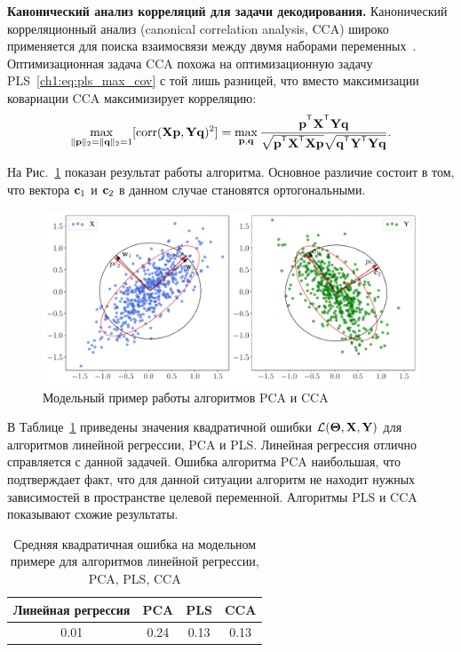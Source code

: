 \vspace{0.5cm}
\textbf{Канонический анализ корреляций для задачи декодирования.}
Канонический корреляционный анализ (canonical correlation analysis, CCA) широко применяется для поиска взаимосвязи между двумя наборами переменных~\cite{hotelling1992relations,anderson1962introduction}. 
Оптимизационная задача CCA похожа на оптимизационную задачу PLS~\eqref{ch1:eq:pls_max_cov} с той лишь разницей, что вместо максимизации ковариации CCA максимизирует корреляцию:
\begin{equation}
	\max_{\|\bp\|_{2}=\|\bq\|_{2}=1}[ \text{corr}(\bX \bp, \bY \bq)^{2}] = \max_{\bp, \bq} \frac{\bp^{\T} \bX^{\T} \bY \bq}{\sqrt{\bp^{\T} \bX^{\T}  \bX \bp} \sqrt{\bq^{\T} \bY^{\T}  \bY\bq}}.
	\label{ch1:eq:cca_max_corr}
\end{equation}

На Рис.~\ref{ch1:fig:cca_toy_example} показан результат работы алгоритма. 
Основное различие состоит в том, что вектора $\mathbf{c}_1$ и $\mathbf{c}_2$ в данном случае становятся ортогональными.

\begin{figure}[h]
	\centering
	\includegraphics[width=\linewidth]{figs/ch1/cca_toy_example}
	\caption{Модельный пример работы алгоритмов PCA и CCA}
	\label{ch1:fig:cca_toy_example}
\end{figure}

В Таблице~\ref{ch1:tbl:toy_example_results} приведены значения квадратичной ошибки $\mathcal{L}(\boldsymbol{\Theta}, \mathbf{X}, \mathbf{Y})$ для алгоритмов линейной регрессии, PCA и PLS.
Линейная регрессия отлично справляется с данной задачей.
Ошибка алгоритма PCA наибольшая, что подтверждает факт, что для данной ситуации алгоритм не находит нужных зависимостей в пространстве целевой переменной. 
Алгоритмы PLS и CCA показывают схожие результаты.

\begin{table}[]
	\centering
	\begin{tabular}{|c|c|c|c|}
		\hline
		\textbf{Линейная регрессия} & \textbf{PCA}   & \textbf{PLS}  &  \textbf{CCA}  \\ \hline
		0.01 &  0.24   &  0.13 &  0.13 \\ \hline
	\end{tabular}
	\caption{Средняя квадратичная ошибка на модельном примере для алгоритмов линейной регрессии, PCA, PLS, CCA}
	\label{ch1:tbl:toy_example_results}
\end{table} 


